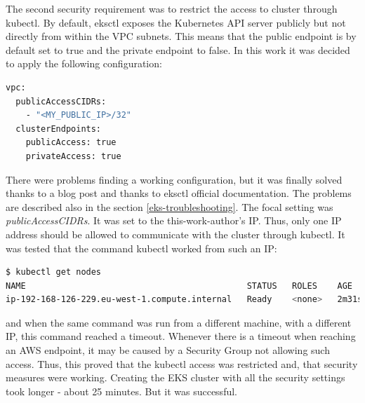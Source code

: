 The second security requirement was to restrict the access to cluster through kubectl. By default, eksctl exposes the Kubernetes API server publicly but not directly from within the VPC subnets. This means that the public endpoint is by default set to true and the private endpoint to false\cite{eksctl-net}. In this work it was decided to apply the following configuration:
\begin{lstlisting}[basicstyle=\tiny,caption={TODO},captionpos=b,language=Bash,xleftmargin=1cm]
vpc:
  publicAccessCIDRs:
    - "<MY_PUBLIC_IP>/32"
  clusterEndpoints:
    publicAccess: true
    privateAccess: true
\end{lstlisting}
There were problems finding a working configuration, but it was finally solved thanks to a blog post\cite{eksctl-net-issue-solution} and thanks to eksctl official documentation\cite{eksctl-net}. The problems are described also in the section \ref{eks-troubleshooting}. The focal setting was \textit{publicAccessCIDRs}. It was set to the this-work-author's IP. Thus, only one IP address should be allowed to communicate with the cluster through kubectl. It was tested that the command kubectl worked from such an IP:
\begin{lstlisting}[basicstyle=\tiny,caption={TODO},captionpos=b,language=Bash,xleftmargin=1cm]
$ kubectl get nodes
NAME                                            STATUS   ROLES    AGE     VERSION
ip-192-168-126-229.eu-west-1.compute.internal   Ready    <none>   2m31s   v1.16.8-eks-e16311
\end{lstlisting}
and when the same command was run from a different machine, with a different IP, this command reached a timeout. Whenever there is a timeout when reaching an AWS endpoint, it may be caused by a Security Group not allowing such access. Thus, this proved that the kubectl access was restricted and, that security measures were working. Creating the EKS cluster with all the security settings took longer - about 25 minutes. But it was successful.

